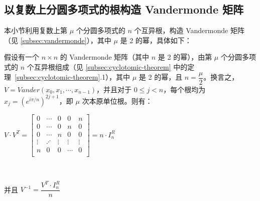 \subsection{以复数上分圆多项式的根构造 Vandermonde 矩阵}
\label{subsec:vandermonde-euler}

 
 
本小节利用复数上第 $\mu$ 个分圆多项式的 $n$ 个互异根，构造 Vandermonde 矩阵（见 \autoref{subsec:vandermonde}），其中 $\mu$ 是 2 的幂，具体如下：



\begin{tcolorbox}[title={\textbf{\tboxtheorem{\ref*{subsec:vandermonde-euler}} 以复数上指标为 2 的幂的分圆多项式的根构造 Vandermonde 矩阵}}]

假设有一个 $n \times n$ 的 Vandermonde 矩阵（其中 $n$ 是 2 的幂），由第 $\mu$ 个分圆多项式的 $n$ 个互异根组成（见 \autoref{subsec:cyclotomic-theorem} 中的定理~\ref*{subsec:cyclotomic-theorem}.1），其中 $\mu$ 是 2 的幂，且 $n = \dfrac{\mu}{2}$。换言之，$V = \mathit{Vander}(x_0, x_1, \cdots, x_{n-1})$，并且对于 $0 \leq j<n$，每个根均为 $x_j = (e^{i\pi/n})^{2j+1}$，即 $\mu$ 次本原单位根。则有：

$V \cdot V^T = \begin{bmatrix}
0 & \cdots & 0 & 0 & n\\
0 & \cdots & 0 & n & 0\\
0 & \cdots & n & 0 & 0\\
\vdots & \iddots & \vdots & \vdots & \vdots \\
n & 0 & 0 & \cdots & 0\\
\end{bmatrix} = n \cdot I^R_n$

$ $

并且 $V^{-1} = \dfrac{V^T \cdot I_n^R}{n}$


\end{tcolorbox}

